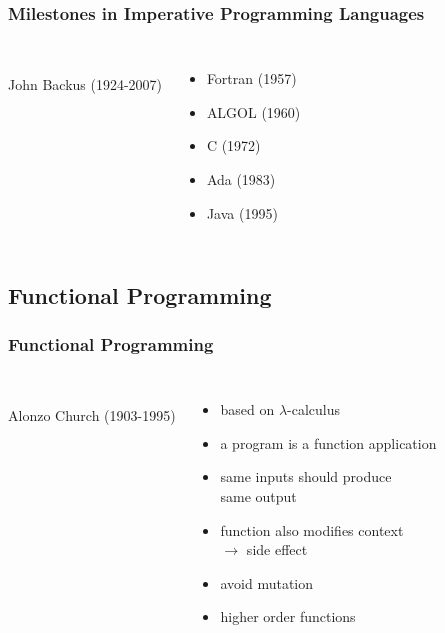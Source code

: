 \documentclass[dvipsnames]{beamer}
\theoremstyle{plain}
\begin{document}
\begin{frame}
  \frametitle{Milestones in Imperative Programming Languages}

  \begin{columns}
    \begin{center}
      \\
      John Backus (1924-2007)
    \end{center}

    \begin{itemize}
      \item Fortran (1957)
      \item ALGOL (1960)
      \item C (1972)
      \item Ada (1983)
      \item Java (1995)
    \end{itemize}
  \end{columns}
\end{frame}

\subsection{Functional Programming}

\begin{frame}
  \frametitle{Functional Programming}

  \begin{columns}
    \begin{center}
      \\
      Alonzo Church (1903-1995)
    \end{center}

    \begin{itemize}
      \item based on $\lambda$-calculus
      \item a program is a function application
      \item same inputs should produce\\
        same output

      \pause
      \medskip
      \item function also modifies context\\
        $\rightarrow$ \alert{side effect}
      \item avoid mutation
      \item higher order functions
    \end{itemize}
  \end{columns}
\end{frame}
\end{document}
